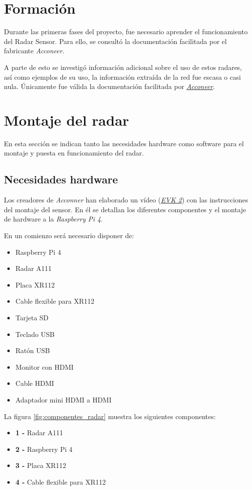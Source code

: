 \section{Formación}
Durante las primeras fases del proyecto, fue necesario aprender el funcionamiento del Radar Sensor. Para ello, se consultó la documentación facilitada por el fabricante \textit{Acconeer}.

A parte de esto se investigó información adicional sobre el uso de estos radares, así como ejemplos de su uso, la información extraída de la red fue escasa o casi nula. Únicamente fue válida la documentación facilitada por \href{https://acconeer-python-exploration.readthedocs.io/}{\textit{Acconeer}}.

\section{Montaje del radar}

En esta sección se indican tanto las necesidades hardware como software para el montaje y puesta en funcionamiento del radar.

\subsection{Necesidades hardware}
Los creadores de \textit{Acconner} han elaborado un vídeo (\href{https://www.youtube.com/watch?v=0uKrm_RAV_c}{\textit{EVK 2}}) con las instrucciones del montaje del sensor. En él se detallan los diferentes componentes y el montaje de hardware a la \textit{Raspberry Pi 4}.

En un comienzo será necesario disponer de: 
\begin{itemize}
	\item Raspberry Pi 4
	\item Radar A111
	\item Placa XR112
	\item Cable flexible para XR112
	\item Tarjeta SD
	\item Teclado USB
	\item Ratón USB
	\item Monitor con HDMI
	\item Cable HDMI
	\item Adaptador mini HDMI a HDMI
\end{itemize}


La figura \ref{fig:componentes_radar} muestra los siguientes componentes:
\begin{itemize}
	\item[]\textbf{1 -} Radar A111
	\item[]\textbf{2 -} Raspberry Pi 4
	\item[]\textbf{3 -} Placa XR112
	\item[]\textbf{4 -} Cable flexible para XR112
\end{itemize}


